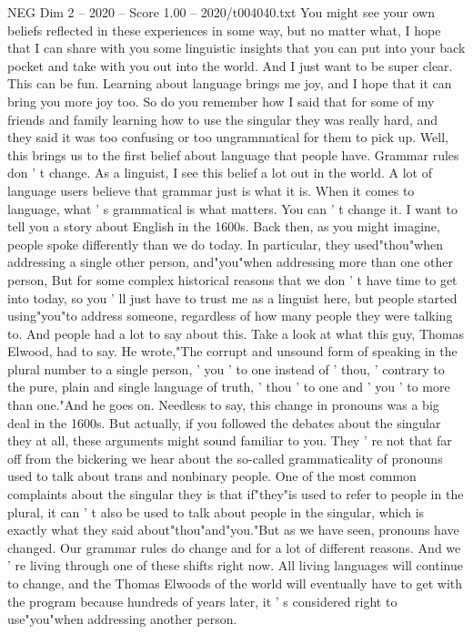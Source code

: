 \begin{textsample}{NEG Dim 2 – 2020 – Score 1.00 – 2020/t004040.txt}
You might see your own beliefs reflected in these experiences in some way, but no matter what, I hope that I can share with you some linguistic insights that you can put into your back pocket and take with you out into the world.
And I just want to be super clear.
This can be fun.
Learning about language brings me joy, and I hope that it can bring you more joy too.
So do you remember how I said that for some of my friends and family learning how to use the singular they was really hard, and they said it was too confusing or too ungrammatical for them to pick up.
Well, this brings us to the first belief about language that people have.
Grammar rules don ' t change.
As a linguist, I see this belief a lot out in the world.
A lot of language users believe that grammar just is what it is.
When it comes to language, what ' s grammatical is what matters.
You can ' t change it.
I want to tell you a story about English in the 1600s.
Back then, as you might imagine, people spoke differently than we do today.
In particular, they used"thou"when addressing a single other person, and"you"when addressing more than one other person, But for some complex historical reasons that we don ' t have time to get into today, so you ' ll just have to trust me as a linguist here, but people started using"you"to address someone, regardless of how many people they were talking to.
And people had a lot to say about this.
Take a look at what this guy, Thomas Elwood, had to say.
He wrote,"The corrupt and unsound form of speaking in the plural number to a single person, ' you ' to one instead of ' thou, ' contrary to the pure, plain and single language of truth, ' thou ' to one and ' you ' to more than one."And he goes on.
Needless to say, this change in pronouns was a big deal in the 1600s.
But actually, if you followed the debates about the singular they at all, these arguments might sound familiar to you.
They ' re not that far off from the bickering we hear about the so-called grammaticality of pronouns used to talk about trans and nonbinary people.
One of the most common complaints about the singular they is that if"they"is used to refer to people in the plural, it can ' t also be used to talk about people in the singular, which is exactly what they said about"thou"and"you."But as we have seen, pronouns have changed.
Our grammar rules do change and for a lot of different reasons.
And we ' re living through one of these shifts right now.
All living languages will continue to change, and the Thomas Elwoods of the world will eventually have to get with the program because hundreds of years later, it ' s considered right to use"you"when addressing another person.

\end{textsample}
